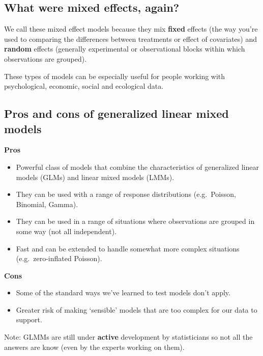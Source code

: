 \documentclass[
  openany]{book}
\begin{document}
\hypertarget{what-were-mixed-effects-again}{%
\subsection{What were mixed effects, again?}\label{what-were-mixed-effects-again}}

We call these mixed effect models because they mix \textbf{fixed} effects (the way you're used to comparing the differences between treatments or effect of covariates) and \textbf{random} effects (generally experimental or observational blocks within which observations are grouped).

These types of models can be especially useful for people working with psychological, economic, social and ecological data.

\hypertarget{pros-and-cons-of-generalized-linear-mixed-models}{%
\subsection{Pros and cons of generalized linear mixed models}\label{pros-and-cons-of-generalized-linear-mixed-models}}

\textbf{Pros}

\begin{itemize}
\item
  Powerful class of models that combine the characteristics of generalized linear models (GLMs) and linear mixed models (LMMs).
\item
  They can be used with a range of response distributions (e.g.~Poisson, Binomial, Gamma).
\item
  They can be used in a range of situations where observations are grouped in some way (not all independent).
\item
  Fast and can be extended to handle somewhat more complex situations (e.g.~zero-inflated Poisson).
\end{itemize}

\textbf{Cons}

\begin{itemize}
\item
  Some of the standard ways we've learned to test models don't apply.
\item
  Greater risk of making `sensible' models that are too complex for our data to support.
\end{itemize}

Note: GLMMs are still under \textbf{active} development by statisticians so not all the answers are know (even by the experts working on them).
\end{document}
